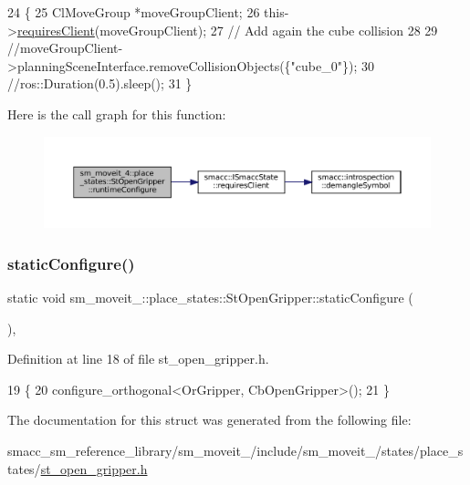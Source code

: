 \begin{DoxyCode}
24     \{
25         ClMoveGroup *moveGroupClient;
26         this->\hyperlink{classsmacc_1_1ISmaccState_a7f95c9f0a6ea2d6f18d1aec0519de4ac}{requiresClient}(moveGroupClient);
27         \textcolor{comment}{// Add again the cube collision}
28 
29         \textcolor{comment}{//moveGroupClient->planningSceneInterface.removeCollisionObjects(\{"cube\_0"\});}
30         \textcolor{comment}{//ros::Duration(0.5).sleep();}
31     \}
\end{DoxyCode}
Here is the call graph for this function\+:
\nopagebreak
\begin{figure}[H]
\begin{center}
\leavevmode
\includegraphics[width=350pt]{structsm__moveit__4_1_1place__states_1_1StOpenGripper_a4ed0bd438003c52f035b3d3fb8cb7ac3_cgraph}
\end{center}
\end{figure}
\mbox{\label{structsm__moveit__4_1_1place__states_1_1StOpenGripper_a83a52c51baf50a5519763fcf7a5f5a22}} 
\subsubsection{\texorpdfstring{static\+Configure()}{staticConfigure()}}
{\footnotesize\ttfamily static void sm\+\_\+moveit\+\_\+::place\+\_\+states\+::\+St\+Open\+Gripper\+::static\+Configure (\begin{DoxyParamCaption}{ }\end{DoxyParamCaption})\hspace{0.3cm}{\ttfamily [inline]}, {\ttfamily [static]}}



Definition at line 18 of file st\+\_\+open\+\_\+gripper.\+h.


\begin{DoxyCode}
19     \{
20         configure\_orthogonal<OrGripper, CbOpenGripper>();
21     \}
\end{DoxyCode}


The documentation for this struct was generated from the following file\+:\begin{DoxyCompactItemize}
\item 
smacc\+\_\+sm\+\_\+reference\+\_\+library/sm\+\_\+moveit\+\_/include/sm\+\_\+moveit\+\_/states/place\+\_\+states/\hyperlink{4_2include_2sm__moveit__4_2states_2place__states_2st__open__gripper_8h}{st\+\_\+open\+\_\+gripper.\+h}\end{DoxyCompactItemize}
